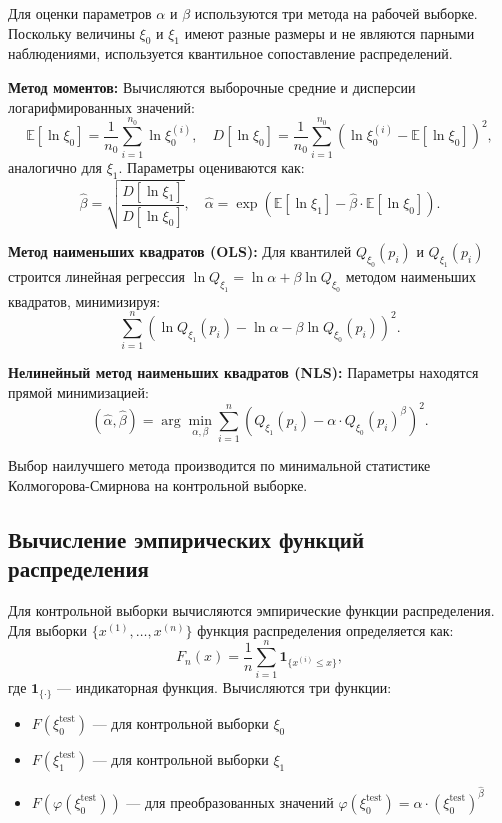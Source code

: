 \documentclass[a4paper, 14pt]{extarticle}
\begin{document}
Для оценки параметров $\alpha$ и $\beta$ используются три метода на рабочей выборке. Поскольку величины $\xi_0$ и $\xi_1$ имеют разные размеры и не являются парными наблюдениями, используется квантильное сопоставление распределений.

\textbf{Метод моментов:} Вычисляются выборочные средние и дисперсии логарифмированных значений:
\[
\mathbb{E}[\ln \xi_0] = \frac{1}{n_0} \sum_{i=1}^{n_0} \ln \xi_0^{(i)}, \quad
D[\ln \xi_0] = \frac{1}{n_0} \sum_{i=1}^{n_0} (\ln \xi_0^{(i)} - \mathbb{E}[\ln \xi_0])^2,
\]
аналогично для $\xi_1$. Параметры оцениваются как:
\[
\hat{\beta} = \sqrt{\frac{D[\ln \xi_1]}{D[\ln \xi_0]}}, \quad
\hat{\alpha} = \exp\left(\mathbb{E}[\ln \xi_1] - \hat{\beta} \cdot \mathbb{E}[\ln \xi_0]\right).
\]

\textbf{Метод наименьших квадратов (OLS):} Для квантилей $Q_{\xi_0}(p_i)$ и $Q_{\xi_1}(p_i)$ строится линейная регрессия $\ln Q_{\xi_1} = \ln \alpha + \beta \ln Q_{\xi_0}$ методом наименьших квадратов, минимизируя:
\[
\sum_{i=1}^{n} (\ln Q_{\xi_1}(p_i) - \ln \alpha - \beta \ln Q_{\xi_0}(p_i))^2.
\]

\textbf{Нелинейный метод наименьших квадратов (NLS):} Параметры находятся прямой минимизацией:
\[
(\hat{\alpha}, \hat{\beta}) = \arg\min_{\alpha, \beta} \sum_{i=1}^{n} (Q_{\xi_1}(p_i) - \alpha \cdot Q_{\xi_0}(p_i)^{\beta})^2.
\]

Выбор наилучшего метода производится по минимальной статистике Колмогорова-Смирнова на контрольной выборке.

\subsection{Вычисление эмпирических функций распределения}

Для контрольной выборки вычисляются эмпирические функции распределения. Для выборки $\{x^{(1)}, \ldots, x^{(n)}\}$ функция распределения определяется как:
\[
F_n(x) = \frac{1}{n} \sum_{i=1}^{n} \mathbf{1}_{\{x^{(i)} \leq x\}},
\]
где $\mathbf{1}_{\{\cdot\}}$ --- индикаторная функция. Вычисляются три функции:
\begin{itemize}
  \item $F(\xi_0^{\text{test}})$ --- для контрольной выборки $\xi_0$
  \item $F(\xi_1^{\text{test}})$ --- для контрольной выборки $\xi_1$
  \item $F(\varphi(\xi_0^{\text{test}}))$ --- для преобразованных значений $\varphi(\xi_0^{\text{test}}) = \hat{\alpha} \cdot (\xi_0^{\text{test}})^{\hat{\beta}}$
\end{itemize}
\end{document}
